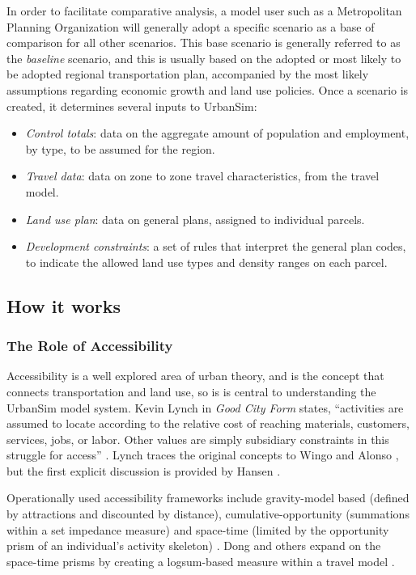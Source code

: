 In order to facilitate comparative analysis, a model user such as a Metropolitan Planning Organization will generally adopt a specific scenario as a base of comparison for all other scenarios. This base scenario is generally referred to as the \emph{baseline} scenario, and this is usually based on the adopted or most likely to be adopted regional transportation plan, accompanied by the most likely assumptions regarding economic growth and land use policies. Once a scenario is created, it determines several inputs to UrbanSim:

\begin{itemize}
    \item \textit{Control totals}: data on the aggregate amount of population and employment, by type, to be assumed for the region.
    \item \textit{Travel data}: data on zone to zone travel characteristics, from the travel model.
    \item \textit{Land use plan}: data on general plans, assigned to individual parcels.
    \item \textit{Development constraints}: a set of rules that interpret the general plan codes, to indicate the allowed land use types and density ranges on each parcel.
\end{itemize}

\subsection{How it works}

\subsubsection{The Role of Accessibility}

Accessibility is a well explored area of urban theory, and is the concept that connects transportation and land use, so is is central to understanding the UrbanSim model system.  Kevin Lynch in \textit{Good City Form} states, \enquote{activities are assumed to locate according to the relative cost of reaching materials, customers, services, jobs, or labor.  Other values are simply subsidiary constraints in this struggle for access} \citep{lynch_good_1984}.  Lynch traces the original concepts to Wingo and Alonso \citep{wingo_transportation_1961,alonso_location_1964}, but the first explicit discussion is provided by Hansen \citep{hansen_how_1959}.

Operationally used accessibility frameworks include gravity-model based (defined by attractions and discounted by distance), cumulative-opportunity (summations within a set impedance measure) and space-time (limited by the opportunity prism of an individual's activity skeleton) \citep{kwan_space-time_1998,miller_measuring_1999}.  Dong and others expand on the space-time prisms by creating a logsum-based measure within a travel model \citep{dong_moving_2006}.  

